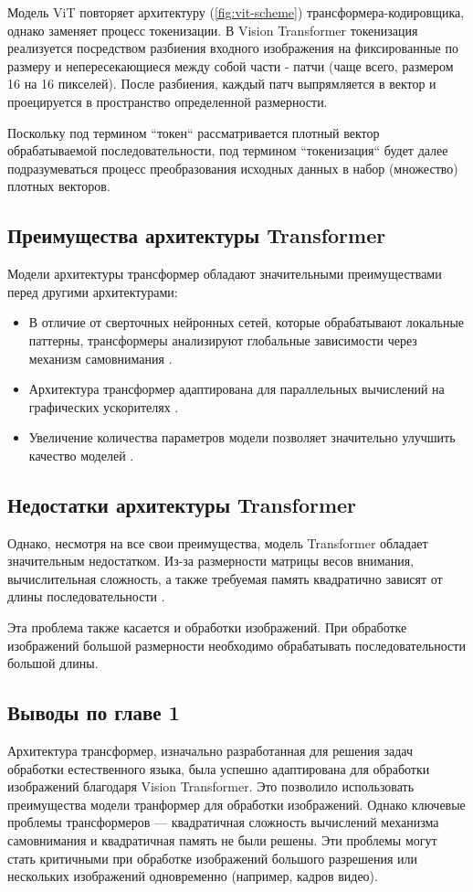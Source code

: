 Модель ViT повторяет архитектуру (\autoref{fig:vit-scheme}) трансформера-кодировщика, однако заменяет процесс токенизации. В Vision Transformer токенизация реализуется посредством разбиения входного изображения на фиксированные по размеру и непересекающиеся между собой части - патчи (чаще всего, размером 16 на 16 пикселей). После разбиения, каждый патч выпрямляется в вектор и проецируется в пространство определенной размерности. 

Поскольку под термином ``токен`` рассматривается плотный вектор обрабатываемой последовательности, под термином ``токенизация`` будет далее подразумеваться процесс преобразования исходных данных в набор (множество) плотных векторов.

\subsection{Преимущества архитектуры Transformer}

Модели архитектуры трансформер обладают значительными преимуществами перед другими архитектурами:

\begin{itemize}
    \item В отличие от сверточных нейронных сетей, которые обрабатывают локальные паттерны, трансформеры анализируют глобальные зависимости через механизм самовнимания \cite{transformer}.
    \item Архитектура трансформер адаптирована для параллельных вычислений на графических ускорителях \cite{transformer}.
    \item Увеличение количества параметров модели позволяет значительно улучшить качество моделей \cite{gpt2}.
\end{itemize}

\subsection{Недостатки архитектуры Transformer}

Однако, несмотря на все свои преимущества, модель Transformer обладает значительным недостатком. Из-за размерности матрицы весов внимания, вычислительная сложность, а также требуемая память квадратично зависят от длины последовательности \cite{transformer_computation_complexity}.

Эта проблема также касается и обработки изображений. При обработке изображений большой размерности необходимо обрабатывать последовательности большой длины.

\subsection{Выводы по главе 1}
Архитектура трансформер, изначально разработанная для решения задач обработки естественного языка, была успешно адаптирована для обработки изображений благодаря Vision Transformer. Это позволило использовать преимущества модели транформер для обработки изображений. Однако ключевые проблемы трансформеров — квадратичная сложность вычислений механизма самовнимания и квадратичная память не были решены. Эти проблемы могут стать критичными при обработке изображений большого разрешения или нескольких изображений одновременно (например, кадров видео).
